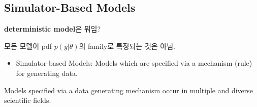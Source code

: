 \documentclass[
]{book}
\providecommand{\tightlist}{%
  \setlength{\itemsep}{0pt}\setlength{\parskip}{0pt}}
\begin{document}
\hypertarget{simulator-based-models}{%
\subsection{Simulator-Based Models}\label{simulator-based-models}}

\textbf{deterministic model}은 뭐임?

모든 모델이 pdf \(p(y \vert \theta)\)의 family로 특정되는 것은 아님.

\begin{itemize}
\tightlist
\item
  Simulator-based Models: Models which are specified via a mechanism (rule) for generating data.
\end{itemize}

Models specified via a data generating mechanism occur in multiple and diverse scientific fields.
\end{document}
